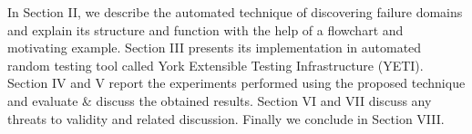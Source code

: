 \documentclass{acm_proc_article-sp}
\begin{document}
In Section II, we describe the automated technique of  discovering failure domains and explain its structure and function with the help of a flowchart and motivating example. Section III presents its implementation in automated random testing tool called York Extensible Testing Infrastructure (YETI). Section IV and V report the experiments performed using the proposed technique and evaluate \& discuss the obtained results. Section VI and VII discuss any threats to validity and related discussion. Finally we conclude in Section VIII. 


\end{document}
